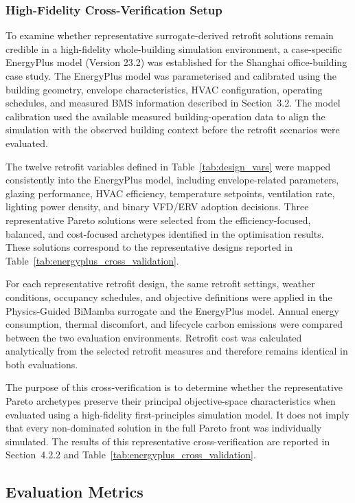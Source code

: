 \documentclass[11pt]{article}
\begin{document}
\subsubsection{High-Fidelity Cross-Verification Setup}

To examine whether representative surrogate-derived retrofit solutions remain credible in a high-fidelity whole-building simulation environment, a case-specific EnergyPlus model (Version 23.2) was established for the Shanghai office-building case study. The EnergyPlus model was parameterised and calibrated using the building geometry, envelope characteristics, HVAC configuration, operating schedules, and measured BMS information described in Section~3.2. The model calibration used the available measured building-operation data to align the simulation with the observed building context before the retrofit scenarios were evaluated.

The twelve retrofit variables defined in Table~\ref{tab:design_vars} were mapped consistently into the EnergyPlus model, including envelope-related parameters, glazing performance, HVAC efficiency, temperature setpoints, ventilation rate, lighting power density, and binary VFD/ERV adoption decisions. Three representative Pareto solutions were selected from the efficiency-focused, balanced, and cost-focused archetypes identified in the optimisation results. These solutions correspond to the representative designs reported in Table~\ref{tab:energyplus_cross_validation}.

For each representative retrofit design, the same retrofit settings, weather conditions, occupancy schedules, and objective definitions were applied in the Physics-Guided BiMamba surrogate and the EnergyPlus model. Annual energy consumption, thermal discomfort, and lifecycle carbon emissions were compared between the two evaluation environments. Retrofit cost was calculated analytically from the selected retrofit measures and therefore remains identical in both evaluations.

The purpose of this cross-verification is to determine whether the representative Pareto archetypes preserve their principal objective-space characteristics when evaluated using a high-fidelity first-principles simulation model. It does not imply that every non-dominated solution in the full Pareto front was individually simulated. The results of this representative cross-verification are reported in Section~4.2.2 and Table~\ref{tab:energyplus_cross_validation}.

\subsection{Evaluation Metrics}
\end{document}
